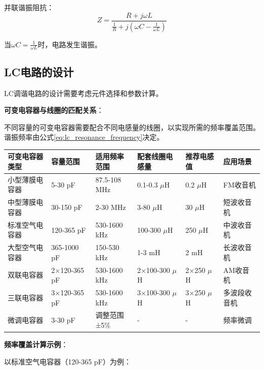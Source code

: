 并联谐振阻抗：
\begin{equation}
Z = \frac{R + j\omega L}{\frac{1}{R} + j(\omega C - \frac{1}{\omega L})}
\end{equation}

当$\omega C = \frac{1}{\omega L}$时，电路发生谐振。

\subsection{LC电路的设计}
\label{sec:lc_circuit_design}

LC调谐电路的设计需要考虑元件选择和参数计算。

\textbf{可变电容器与线圈的匹配关系}：

不同容量的可变电容器需要配合不同电感量的线圈，以实现所需的频率覆盖范围。谐振频率由公式\eqref{eq:lc_resonance_frequency}决定。

\begin{center}
\small
\begin{tabular}{|p{2.5cm}|p{1.5cm}|p{2cm}|p{2cm}|p{1.5cm}|p{1.5cm}|}
\hline
\textbf{可变电容器类型} & \textbf{容量范围} & \textbf{适用频率范围} & \textbf{配套线圈电感量} & \textbf{推荐电感值} & \textbf{应用场景} \\
\hline
小型薄膜电容器 & 5-30 pF & 87.5-108 MHz & 0.1-0.3 $\mu$H & 0.2 $\mu$H & FM收音机 \\
中型薄膜电容器 & 30-150 pF & 2-30 MHz & 3-80 $\mu$H & 30 $\mu$H & 短波收音机 \\
标准空气电容器 & 120-365 pF & 530-1600 kHz & 100-300 $\mu$H & 250 $\mu$H & 中波收音机 \\
大型空气电容器 & 365-1000 pF & 150-530 kHz & 1-3 mH & 2 mH & 长波收音机 \\
双联电容器 & 2×120-365 pF & 530-1600 kHz & 2×100-300 $\mu$H & 2×250 $\mu$H & AM收音机 \\
三联电容器 & 3×120-365 pF & 530-1600 kHz & 3×100-300 $\mu$H & 3×250 $\mu$H & 多波段收音机 \\
微调电容器 & 3-30 pF & 调整范围±5\% & - & - & 频率微调 \\
\hline
\end{tabular}
\end{center}

\textbf{频率覆盖计算示例}：

以标准空气电容器（120-365 pF）为例：

